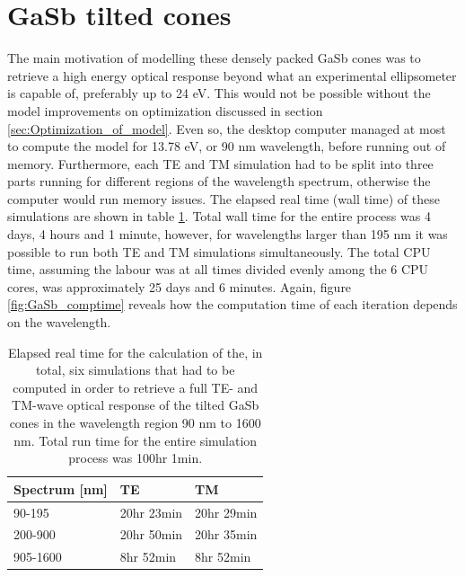 \section{GaSb tilted cones}
\label{sec:results_gasb}
The main motivation of modelling these densely packed GaSb cones was to retrieve a high energy optical response beyond what an experimental ellipsometer is capable of, preferably up to 24 eV. This would not be possible without the model improvements on optimization discussed in section \ref{sec:Optimization_of_model}. Even so, the desktop computer managed at most to compute the model for 13.78 eV, or 90 nm wavelength, before running out of memory. Furthermore, each TE and TM simulation had to be split into three parts running for different regions of the wavelength spectrum, otherwise the computer would run memory issues. The elapsed real time (wall time) of these simulations are shown in table \ref{tab:gasb_computationtimes}. Total wall time for the entire process was 4 days, 4 hours and 1 minute, however, for wavelengths larger than 195 nm it was possible to run both TE and TM simulations simultaneously. The total CPU time, assuming the labour was at all times divided evenly among the 6 CPU cores, was approximately 25 days and 6 minutes. Again, figure \ref{fig:GaSb_comptime} reveals how the computation time of each iteration depends on the wavelength.

\begin{table}[htb]
    \centering
    \caption{Elapsed real time for the calculation of the, in total, six simulations that had to be computed in order to retrieve a full TE- and TM-wave optical response of the tilted GaSb cones in the wavelength region 90 nm to 1600 nm. Total run time for the entire simulation process was 100hr 1min.}
    \label{tab:gasb_computationtimes}
    \begin{tabular}{l l l}
    Spectrum [nm]    &   TE  &   TM    \\    \hline
    90-195  &   20hr 23min  &   20hr 29min\\
    200-900 &   20hr 50min  &   20hr 35min\\
    905-1600    &   8hr 52min   &   8hr 52min   \\  \hline
    \end{tabular}
\end{table}

